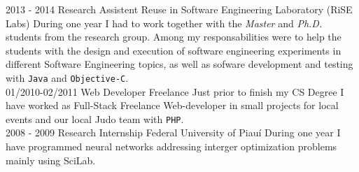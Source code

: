 \documentclass[nocolors]{friggeri-cv-a4}
\begin{document}
\newpage
\begin{entrylist}
	\entry
	{2013 - 2014}
	{Research Assistent}
	{Reuse in Software Engineering Laboratory (RiSE Labs)}
	{During one year I had to work together with the \textit{Master} and \textit{Ph.D.} students from the research group. Among my responsabilities were to help the students with the design and execution of software engineering experiments in different Software Engineering topics, as well as sofware development and testing with \texttt{Java} and \texttt{Objective-C}. \\}
	\entry
	{01/2010-02/2011}
	{Web Developer}
	{Freelance}
	{Just prior to finish my CS Degree I have worked as Full-Stack Freelance Web-developer in small projects for local events and our local Judo team with \texttt{PHP}.\\}
	\entry
	{2008 - 2009}
	{Research Internship}
	{Federal University of Piauí}
	{During one year I have programmed neural networks addressing interger optimization problems mainly using SciLab.}
	
\end{entrylist}
\end{document}
